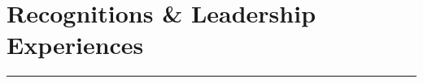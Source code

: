 \documentclass[letterpaper,10pt]{article}
\begin{document}
  \begin{comment}
  
\begin{itemize}[label=$\blacktriangleright$]

	\item \emph{Graduate Part-Time Instructor} PHYS 1403/1404: Algebra-based, Inquiry-based, Laboratory-based Introductory Physics Curriculum. TTU, 2017-Present.  
	
	

	
\item \emph{Teaching Assistant.}  PHYS 1401/2401: Principles of Physics I/II. Lead the laboratories and discussions for the calculus based introductory physics. TTU, 2016-2017.  
  	  

  \item \emph{Undergraduate Teaching Fellow.}  PHYS 2215: Physics for Scientists and Engineers Lab I -  Utah State, Fall 2013.
  \end{itemize}


\end{comment}



\section*{Recognitions \& Leadership Experiences }       

\hrule
\vspace{.3 cm}




\hangindent=0.4cm  
\end{document}
